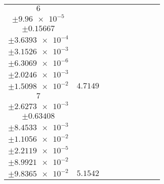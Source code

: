 \documentclass[8pt]{article}
\begin{document}
\begin{longtable}[l]{c c c c c c c c c}
$\num{6}$ & \begin{tabular}[c]{@{}c@{}}$\num{5.9966e-2}$ \\ $\pm\num{9.96e-5}$\end{tabular} & \begin{tabular}[c]{@{}c@{}}$\num{-0.96532}$ \\ $\pm\num{0.15667}$\end{tabular} & \begin{tabular}[c]{@{}c@{}}$\num{6.9995}$ \\ $\pm\num{3.6393e-4}$\end{tabular} & \begin{tabular}[c]{@{}c@{}}$\num{1.5729e+3}$ \\ $\pm\num{3.1526e-3}$\end{tabular} & \begin{tabular}[c]{@{}c@{}}$\num{3.1466}$ \\ $\pm\num{6.3069e-6}$\end{tabular} & \begin{tabular}[c]{@{}c@{}}$\num{1.1603}$ \\ $\pm\num{2.0246e-3}$\end{tabular} & \begin{tabular}[c]{@{}c@{}}$\num{4.0581}$ \\ $\pm\num{1.5098e-2}$\end{tabular} & $\num{4.7149}$\\
$\num{7}$ & \begin{tabular}[c]{@{}c@{}}$\num{9.285e-2}$ \\ $\pm\num{2.6273e-3}$\end{tabular} & \begin{tabular}[c]{@{}c@{}}$\num{-1.1916}$ \\ $\pm\num{0.63408}$\end{tabular} & \begin{tabular}[c]{@{}c@{}}$\num{7.9001e-3}$ \\ $\pm\num{8.4533e-3}$\end{tabular} & \begin{tabular}[c]{@{}c@{}}$\num{1.5746e+3}$ \\ $\pm\num{1.1056e-2}$\end{tabular} & \begin{tabular}[c]{@{}c@{}}$\num{3.1501}$ \\ $\pm\num{2.2119e-5}$\end{tabular} & \begin{tabular}[c]{@{}c@{}}$\num{5.8934}$ \\ $\pm\num{8.9921e-2}$\end{tabular} & \begin{tabular}[c]{@{}c@{}}$\num{8.3653}$ \\ $\pm\num{9.8365e-2}$\end{tabular} & $\num{5.1542}$\\

\end{longtable}
\end{document}

